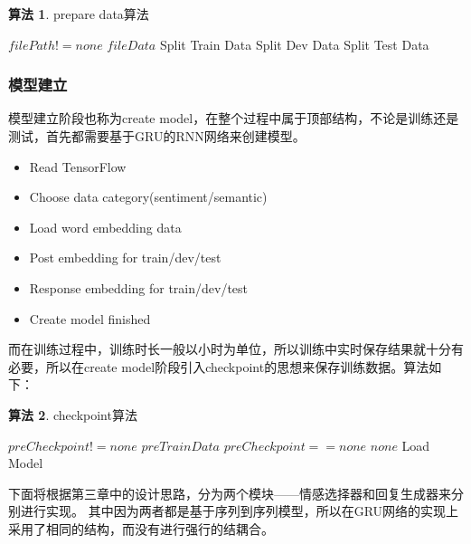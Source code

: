 \documentclass[supercite]{HustGraduPaper}
\theoremstyle{definition}
\newtheorem{alg}{算法}[section]
\begin{document}
\begin{shaded*}
  \begin{alg}{prepare data算法}
  \label{alg:ppd}
  \begin{algorithmic}
      \If $filePath != none$
        \State \Return $fileData$
      \EndIf
      \State Split Train Data
      \State Split Dev Data
      \State Split Test Data
    \EndProcedure
  \end{algorithmic}
  \end{alg}
\end{shaded*}

\subsubsection{模型建立}
模型建立阶段也称为create model，在整个过程中属于顶部结构，不论是训练还是测试，首先都需要基于GRU的RNN网络来创建模型。
\begin{itemize}
  \item Read TensorFlow 
  \item Choose data category(sentiment/semantic)
  \item Load word embedding data
  \item Post embedding for train/dev/test
  \item Response embedding for train/dev/test
  \item Create model finished
\end{itemize}

而在训练过程中，训练时长一般以小时为单位，所以训练中实时保存结果就十分有必要，所以在create model阶段引入checkpoint的思想来保存训练数据。算法如下：

\begin{shaded*}
  \begin{alg}{checkpoint算法}
  \label{alg:cp}
  \begin{algorithmic}
      \If $preCheckpoint != none$
        \State \Return $preTrainData$
      \EndIf
      \If $preCheckpoint == none$
        \State \Return $none$
      \EndIf
      \State Load Model
    \EndProcedure
  \end{algorithmic}
  \end{alg}
\end{shaded*}

下面将根据第三章中的设计思路，分为两个模块——情感选择器和回复生成器来分别进行实现。
其中因为两者都是基于序列到序列模型，所以在GRU网络的实现上采用了相同的结构，而没有进行强行的结耦合。
\end{document}

